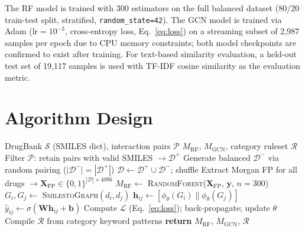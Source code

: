 \documentclass[conference]{IEEEtran}
\begin{document}
The RF model is trained with 300 estimators on the full balanced dataset (80/20 train-test
split, stratified, \texttt{random\_state=42}). The GCN model is trained via Adam
($\mathrm{lr}=10^{-3}$, cross-entropy loss, Eq.~\ref{eq:loss}) on a streaming subset
of 2,987 samples per epoch due to CPU memory constraints; both model checkpoints are
confirmed to exist after training. For text-based similarity evaluation, a held-out test
set of 19,117 samples is used with TF-IDF cosine similarity as the evaluation metric.

\section{Algorithm Design}
\label{sec:algo}

\begin{algorithm}[t]
\caption{DDI Framework Training}
\label{alg:train}
\begin{algorithmic}[1]
\Require DrugBank $\mathcal{S}$ (SMILES dict), interaction pairs $\mathcal{P}$
\Ensure $M_{\mathrm{RF}}$, $M_{\mathrm{GCN}}$, category ruleset $\mathcal{R}$
\State Filter $\mathcal{P}$: retain pairs with valid SMILES $\to \mathcal{D}^+$
\State Generate balanced $\mathcal{D}^-$ via random pairing ($|\mathcal{D}^-|=|\mathcal{D}^+|$)
\State $\mathcal{D} \gets \mathcal{D}^+ \cup \mathcal{D}^-$; shuffle
\State Extract Morgan FP for all drugs $\to \mathbf{X}_{\mathrm{FP}} \in \{0,1\}^{|\mathcal{D}|\times4096}$
\State $M_{\mathrm{RF}} \gets$ \textsc{RandomForest}($\mathbf{X}_{\mathrm{FP}}$, $\mathbf{y}$, $n=300$)
    \State $G_i,G_j \gets$ \textsc{SmilestoGraph}$(d_i,d_j)$
    \State $\mathbf{h}_{ij} \gets [\phi_\theta(G_i)\|\phi_\theta(G_j)]$ \hfill{}
    \State $\hat{y}_{ij} \gets \sigma(\mathbf{W}\mathbf{h}_{ij}+\mathbf{b})$ \hfill{}
    \State Compute $\mathcal{L}$ (Eq.~\ref{eq:loss}); back-propagate; update $\theta$
  \EndFor
\EndFor
\State Compile $\mathcal{R}$ from category keyword patterns
\State \textbf{return} $M_{\mathrm{RF}}$, $M_{\mathrm{GCN}}$, $\mathcal{R}$
\end{algorithmic}
\end{algorithm}
\end{document}
